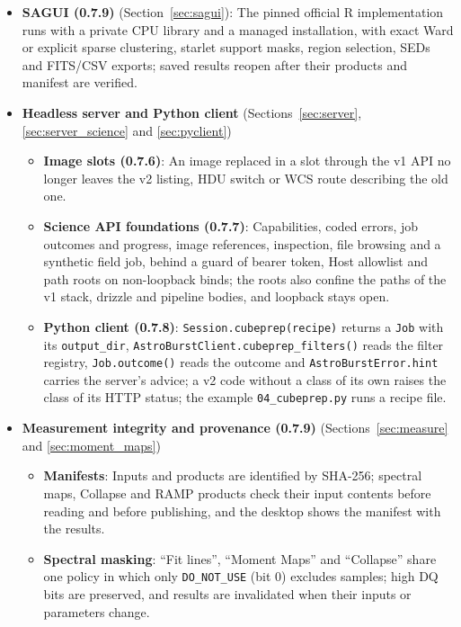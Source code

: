 \documentclass[11pt,a4paper]{article}
\newcommand{\code}[1]{\texttt{\small #1}}
\begin{document}
\begin{itemize}[nosep]
\begin{itemize}[nosep]
        \end{itemize}
    \item \textbf{SAGUI (0.7.9)} (Section~\ref{sec:sagui}): The pinned official R implementation runs with a private CPU library and a managed installation, with exact Ward or explicit sparse clustering, starlet support masks, region selection, SEDs and FITS/CSV exports; saved results reopen after their products and manifest are verified.
    \item \textbf{Headless server and Python client} (Sections~\ref{sec:server}, \ref{sec:server_science} and \ref{sec:pyclient})
        \begin{itemize}[nosep]
        \item \textbf{Image slots (0.7.6)}: An image replaced in a slot through the v1 API no longer leaves the v2 listing, HDU switch or WCS route describing the old one.
        \item \textbf{Science API foundations (0.7.7)}: Capabilities, coded errors, job outcomes and progress, image references, inspection, file browsing and a synthetic field job, behind a guard of bearer token, Host allowlist and path roots on non-loopback binds; the roots also confine the paths of the v1 stack, drizzle and pipeline bodies, and loopback stays open.
        \item \textbf{Python client (0.7.8)}: \code{Session.cubeprep(recipe)} returns a \code{Job} with its \code{output\_dir}, \code{AstroBurstClient.cubeprep\_filters()} reads the filter registry, \code{Job.outcome()} reads the outcome and \code{AstroBurstError.hint} carries the server's advice; a v2 code without a class of its own raises the class of its HTTP status; the example \code{04\_cubeprep.py} runs a recipe file.
        \end{itemize}
    \item \textbf{Measurement integrity and provenance (0.7.9)} (Sections~\ref{sec:measure} and \ref{sec:moment_maps})
        \begin{itemize}[nosep]
        \item \textbf{Manifests}: Inputs and products are identified by SHA-256; spectral maps, Collapse and RAMP products check their input contents before reading and before publishing, and the desktop shows the manifest with the results.
        \item \textbf{Spectral masking}: ``Fit lines'', ``Moment Maps'' and ``Collapse'' share one policy in which only \code{DO\_NOT\_USE} (bit 0) excludes samples; high DQ bits are preserved, and results are invalidated when their inputs or parameters change.

\end{itemize}
\end{itemize}
\end{document}
